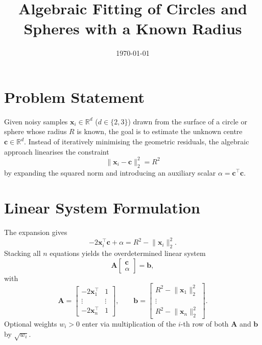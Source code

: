 \documentclass[11pt]{article}
\title{Algebraic Fitting of Circles and Spheres with a Known Radius}
\author{}
\date{\today}
\begin{document}
\maketitle

\section{Problem Statement}
Given noisy samples $\mathbf{x}_i \in \mathbb{R}^d$ ($d \in \{2,3\}$) drawn from the surface of a circle or sphere whose radius $R$ is known, the goal is to estimate the unknown centre $\mathbf{c} \in \mathbb{R}^d$. Instead of iteratively minimising the geometric residuals, the algebraic approach linearises the constraint
\begin{equation}
  \lVert \mathbf{x}_i - \mathbf{c} \rVert_2^2 = R^2
\end{equation}
by expanding the squared norm and introducing an auxiliary scalar $\alpha = \mathbf{c}^\top \mathbf{c}$.

\section{Linear System Formulation}
The expansion gives
\begin{equation}
  -2\mathbf{x}_i^\top \mathbf{c} + \alpha = R^2 - \lVert \mathbf{x}_i \rVert_2^2.
\end{equation}
Stacking all $n$ equations yields the overdetermined linear system
\begin{equation}
  \label{eq:linear_system}
  \mathbf{A} \begin{bmatrix} \mathbf{c} \\ \alpha \end{bmatrix} = \mathbf{b},
\end{equation}
with
\begin{equation}
  \mathbf{A} =
  \begin{bmatrix}
    -2\mathbf{x}_1^\top & 1 \\
    \vdots & \vdots \\
    -2\mathbf{x}_n^\top & 1
  \end{bmatrix},
  \qquad
  \mathbf{b} =
  \begin{bmatrix}
    R^2 - \lVert \mathbf{x}_1 \rVert_2^2 \\
    \vdots \\
    R^2 - \lVert \mathbf{x}_n \rVert_2^2
  \end{bmatrix}.
\end{equation}
Optional weights $w_i > 0$ enter via multiplication of the $i$-th row of both $\mathbf{A}$ and $\mathbf{b}$ by $\sqrt{w_i}$.
\end{document}
